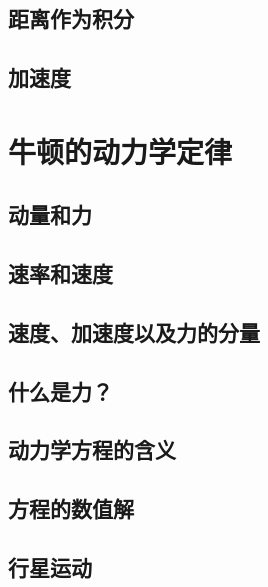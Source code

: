 \documentclass[12pt,oneside]{book}
\begin{document}
\begin{common-format}
\section{距离作为积分}


\section{加速度}


\chapter{牛顿的动力学定律}


\section{动量和力}


\section{速率和速度}


\section{速度、加速度以及力的分量}


\section{什么是力？}

\section{动力学方程的含义}


\section{方程的数值解}


\section{行星运动}





\end{common-format}
\end{document}
